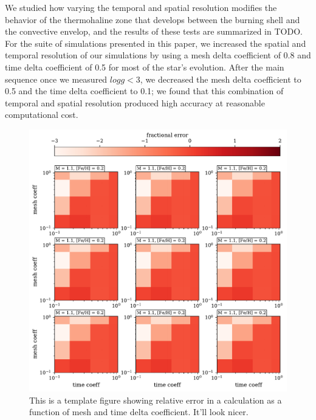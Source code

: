 We studied how varying the temporal and spatial resolution modifies the behavior of the thermohaline zone that develops between the burning shell and the convective envelop, and the results of these tests are summarized in TODO.
For the suite of simulations presented in this paper, we increased the spatial and temporal resolution of our simulations by using a mesh delta coefficient of 0.8 and time delta coefficient of 0.5 for most of the star's evolution.
After the main sequence once we measured $log g < 3$, we decreased the mesh delta coefficient to 0.5 and the time delta coefficient to 0.1; we found that this combination of temporal and spatial resolution produced high accuracy at reasonable computational cost.


\begin{figure}[!tb]
\begin{center}
\includegraphics[width=\textwidth]{./figures/resolution_test/resolution_test.pdf}
\caption{This is a template figure showing relative error in a calculation as a function of mesh and time delta coefficient. It'll look nicer. }
\label{Fig:resolution_test}
\end{center}
\end{figure}